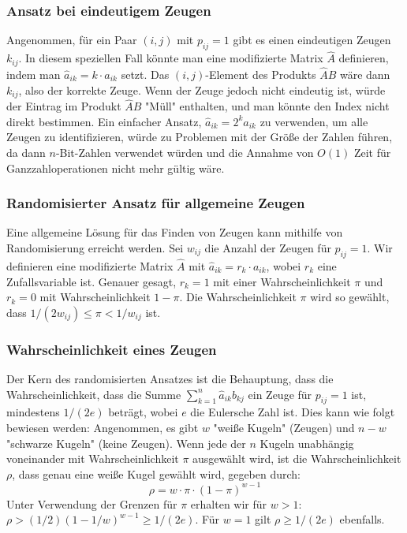 \documentclass{scrartcl}
\numberwithin{equation}{section}
\begin{document}
\subsubsection{Ansatz bei eindeutigem Zeugen}
Angenommen, für ein Paar $(i, j)$ mit $p_{ij}=1$ gibt es einen eindeutigen Zeugen $k_{ij}$. In diesem speziellen Fall könnte man eine modifizierte Matrix $\hat{A}$ definieren, indem man $\hat{a}_{ik} = k \cdot a_{ik}$ setzt. Das $(i, j)$-Element des Produkts $\hat{A}B$ wäre dann $k_{ij}$, also der korrekte Zeuge. Wenn der Zeuge jedoch nicht eindeutig ist, würde der Eintrag im Produkt $\hat{A}B$ "Müll" enthalten, und man könnte den Index nicht direkt bestimmen. Ein einfacher Ansatz, $\hat{a}_{ik}=2^k a_{ik}$ zu verwenden, um alle Zeugen zu identifizieren, würde zu Problemen mit der Größe der Zahlen führen, da dann $n$-Bit-Zahlen verwendet würden und die Annahme von $O(1)$ Zeit für Ganzzahloperationen nicht mehr gültig wäre.

\subsubsection{Randomisierter Ansatz für allgemeine Zeugen}
Eine allgemeine Lösung für das Finden von Zeugen kann mithilfe von Randomisierung erreicht werden. Sei $w_{ij}$ die Anzahl der Zeugen für $p_{ij}=1$. Wir definieren eine modifizierte Matrix $\hat{A}$ mit $\hat{a}_{ik} = r_k \cdot a_{ik}$, wobei $r_k$ eine Zufallsvariable ist. Genauer gesagt, $r_k=1$ mit einer Wahrscheinlichkeit $\pi$ und $r_k=0$ mit Wahrscheinlichkeit $1-\pi$. Die Wahrscheinlichkeit $\pi$ wird so gewählt, dass $1/(2w_{ij}) \le \pi < 1/w_{ij}$ ist.

\subsubsection{Wahrscheinlichkeit eines Zeugen}
Der Kern des randomisierten Ansatzes ist die Behauptung, dass die Wahrscheinlichkeit, dass die Summe $\sum_{k=1}^{n} \hat{a}_{ik} b_{kj}$ ein Zeuge für $p_{ij}=1$ ist, mindestens $1/(2e)$ beträgt, wobei $e$ die Eulersche Zahl ist. Dies kann wie folgt bewiesen werden: Angenommen, es gibt $w$ "weiße Kugeln" (Zeugen) und $n-w$ "schwarze Kugeln" (keine Zeugen). Wenn jede der $n$ Kugeln unabhängig voneinander mit Wahrscheinlichkeit $\pi$ ausgewählt wird, ist die Wahrscheinlichkeit $\rho$, dass genau eine weiße Kugel gewählt wird, gegeben durch:
$$\rho = w \cdot \pi \cdot (1-\pi)^{w-1}$$
Unter Verwendung der Grenzen für $\pi$ erhalten wir für $w > 1$: $\rho > (1/2)(1-1/w)^{w-1} \ge 1/(2e)$. Für $w=1$ gilt $\rho \ge 1/(2e)$ ebenfalls.
\end{document}
